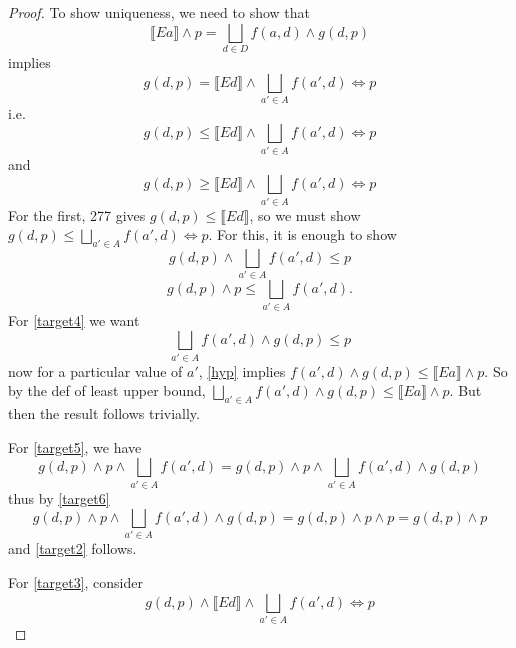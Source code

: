 \documentclass{article}
\newcommand{\lb}{\llbracket}
\newcommand{\rb}{\rrbracket}
\theoremstyle{definition}
\begin{document}
\begin{proof}
    To show uniqueness, we need to show that 
    \begin{equation}\label{hyp}
        \lb Ea \rb \wedge p = \bigsqcup_{d \in D} f(a, d) \wedge g(d, p)
    \end{equation}
    implies 
    \begin{equation}\label{target1}
        g(d, p) = \lb Ed \rb \wedge \bigsqcup_{a' \in A} f(a', d) \Leftrightarrow p 
    \end{equation}
    i.e.
    \begin{equation}\label{target2}
        g(d, p) \leq \lb Ed \rb \wedge \bigsqcup_{a' \in A} f(a', d) \Leftrightarrow p 
    \end{equation}
    and 
    \begin{equation}\label{target3}
        g(d, p) \geq \lb Ed \rb \wedge \bigsqcup_{a' \in A} f(a', d) \Leftrightarrow p 
    \end{equation}
    For the first, 277 gives $g(d, p) \leq \lb Ed \rb$, so we must show $g(d,p) \leq \bigsqcup_{a' \in A} f(a', d) \Leftrightarrow p$.
    For this, it is enough to show
    \begin{equation}\label{target4}
        g(d,p) \wedge \bigsqcup_{a' \in A} f(a', d) \leq p 
    \end{equation}
    \begin{equation}\label{target5}
        g(d,p) \wedge p \leq \bigsqcup_{a' \in A} f(a', d).
    \end{equation}
    For \eqref{target4} we want 
    \begin{equation}\label{target6}
         \bigsqcup_{a' \in A} f(a', d) \wedge g(d, p) \leq p 
    \end{equation}
    now for a particular value of $a'$, \eqref{hyp} implies $f(a', d) \wedge g(d, p) \leq \lb Ea \rb \wedge p$.
    So by the def of least upper bound, $\bigsqcup_{a' \in A} f(a', d) \wedge g(d, p) \leq \lb Ea \rb \wedge p$. But
    then the result follows trivially.

    For \eqref{target5}, we have 
    \[
        g(d,p) \wedge p \wedge \bigsqcup_{a' \in A} f(a', d) =  g(d,p) \wedge p \wedge \bigsqcup_{a' \in A} f(a', d) \wedge g(d, p)
    \]
    thus by \eqref{target6}
    \[
        g(d,p) \wedge p \wedge \bigsqcup_{a' \in A} f(a', d) \wedge g(d, p) = g(d,p) \wedge p \wedge p = g(d,p) \wedge p
    \]
    and \eqref{target2} follows.

    For \eqref{target3}, consider
    \begin{equation}
        g(d, p) \wedge \lb Ed \rb \wedge \bigsqcup_{a' \in A} f(a', d) \Leftrightarrow p 
    \end{equation}
\end{proof}
\end{document}
